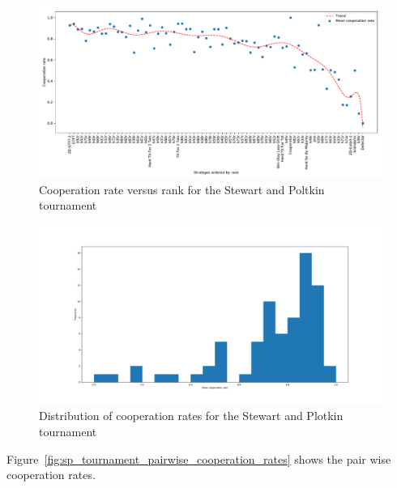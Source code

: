 \documentclass{article}
\begin{document}
\begin{figure}[!hbtp]
    \centering
    \includegraphics[width=.8\textwidth]{assets/sp_tournament_cooperation_rate_versus_rank.pdf}
    \caption{Cooperation rate versus rank for the Stewart and Poltkin tournament}
    \label{fig:sp_tournament_cooperation_rate_versus_rank}
\end{figure}


\begin{figure}[!hbtp]
    \centering
    \includegraphics[width=.8\textwidth]{assets/sp_tournament_cooperation_rates.pdf}
    \caption{Distribution of cooperation rates for the Stewart and Plotkin
    tournament}
    \label{fig:sp_tournament_cooperation_rates}
\end{figure}

Figure~\ref{fig:sp_tournament_pairwise_cooperation_rates} shows the pair wise
cooperation rates.
\end{document}
